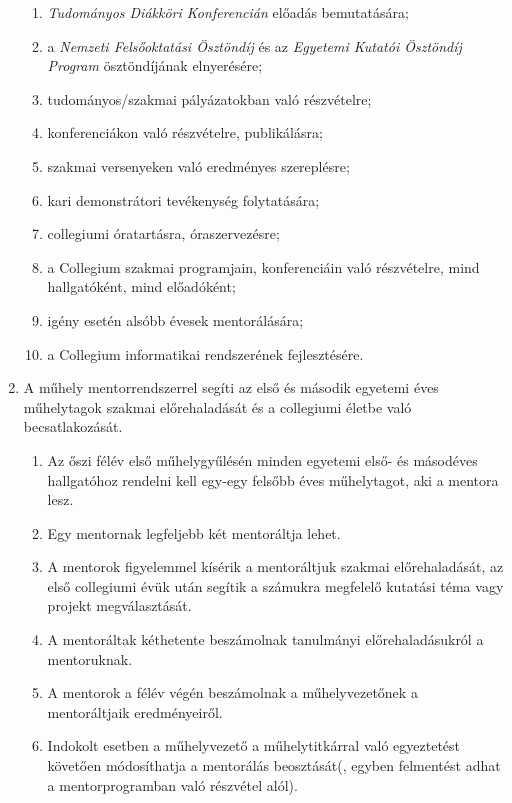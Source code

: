 \documentclass{../styles/rulebook}
\begin{document}
\begin{enumerate}
\begin{enumerate}
		      \item \emph{Tudományos Diákköri Konferencián} előadás bemutatására;
		      \item a \emph{Nemzeti Felsőoktatási Ösztöndíj} és az \emph{Egyetemi Kutatói Ösztöndíj Program} ösztöndíjának elnyerésére;
		      \item tudományos/szakmai pályázatokban való részvételre;
		      \item konferenciákon való részvételre, publikálásra;
		      \item szakmai versenyeken való eredményes szereplésre;
		      \item kari demonstrátori tevékenység folytatására;
		      \item collegiumi óratartásra, óraszervezésre;
		      \item a Collegium szakmai programjain, konferenciáin való részvételre, mind hallgatóként, mind előadóként;
		      \item igény esetén alsóbb évesek mentorálására;
		      \item a Collegium informatikai rendszerének fejlesztésére.
	      \end{enumerate}
	\item A műhely mentorrendszerrel segíti az első és második egyetemi éves műhelytagok szakmai előrehaladását és a collegiumi életbe való becsatlakozását.
	      \begin{enumerate}
		      \item Az őszi félév első műhelygyűlésén minden egyetemi első- és másodéves hallgatóhoz rendelni kell egy-egy felsőbb éves műhelytagot, aki a mentora lesz.
		      \item Egy mentornak legfeljebb két mentoráltja lehet.
		      \item A mentorok figyelemmel kísérik a mentoráltjuk szakmai előrehaladását, az első collegiumi évük után segítik a számukra megfelelő kutatási téma vagy projekt megválasztását.
		      \item A mentoráltak kéthetente beszámolnak tanulmányi előrehaladásukról a mentoruknak.
		      \item A mentorok a félév végén beszámolnak a műhelyvezetőnek a mentoráltjaik eredményeiről.
		      \item Indokolt esetben a műhelyvezető a műhelytitkárral való egyeztetést követően módosíthatja a mentorálás beosztását(, egyben felmentést adhat a mentorprogramban való részvétel alól).
	      \end{enumerate}
\end{enumerate}
\end{document}
